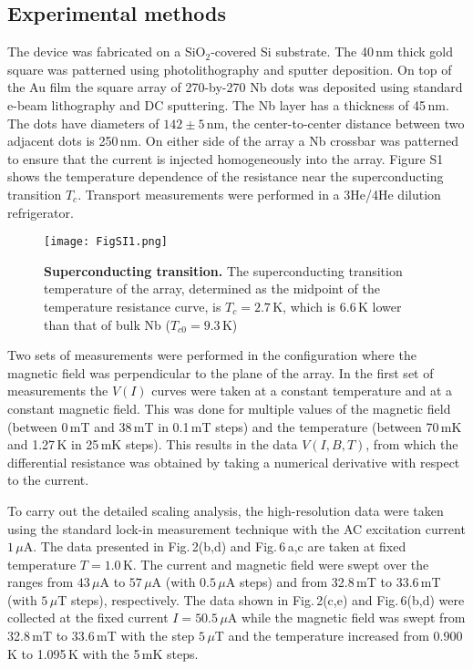 \documentclass[aps,twocolumn,prl,10pt,amsmath,amssymb,nofootinbib,showpacs,superscriptaddress,floatfix]{revtex4-1}
\begin{document}
\subsection{Experimental methods}
The device was fabricated on a SiO$_2$-covered Si substrate. The 40\,nm thick gold square was patterned using photolithography and sputter deposition. On top of the Au film the square array of 270-by-270 Nb dots was deposited using standard e-beam lithography and DC sputtering. The Nb layer has a thickness of 45\,nm. The dots have diameters of $142\pm 5$\,nm, the center-to-center distance between two adjacent dots is 250\,nm. On  either side of the array a Nb crossbar was patterned to ensure that the current is injected homogeneously into the array. Figure S1 shows the temperature dependence of the resistance near the superconducting transition $T_c$. Transport measurements were performed in a 3He/4He dilution refrigerator. 

\begin{figure}[h!]
	\begin{center}
		\texttt{[image: FigSI1.png]} %
		\caption{{\bf Superconducting transition.} 
			The superconducting transition temperature of the array, determined as the midpoint of the temperature resistance curve, is $T_c = 2.7$\,K, which is 6.6\,K lower than that of bulk Nb ($T_{c0} = 9.3$\,K)
		}
		\label{Sup1}
	\end{center}
\end{figure}

Two sets of measurements were performed in the configuration where the magnetic field was perpendicular to the plane of the array. 
In the first set of measurements the $V(I)$ curves were taken at a constant temperature and at a constant magnetic field. 
This was done for multiple values of the magnetic field (between 0\,mT and 38\,mT in 0.1\,mT steps) and the temperature (between 70\,mK and 1.27\,K in 25\,mK steps). This results in the data $V(I,B,T)$, from which the differential resistance was obtained by taking a numerical derivative with respect to the current. 

To carry out the detailed scaling analysis, the high-resolution data were taken using the standard lock-in measurement technique with the AC excitation current $1\,\mu$A. 
The data presented in Fig.\,2(b,d) and Fig.\,6\,a,c are taken at fixed temperature $T=1.0$\,K. The current and magnetic field were swept over the ranges from $43\,\mu$A to $57\,\mu$A (with $0.5\,\mu$A steps) and from 32.8\,mT to 33.6\,mT (with $5\,\mu$T steps), respectively. 
The data shown in Fig.\,2(c,e) and Fig.\,6(b,d) were collected at  the fixed current $I = 50.5$\,$\mu$A while the magnetic field was swept from 32.8\,mT to 33.6\,mT with the step $5\,\mu$T and the temperature increased from 0.900\,K to 1.095\,K with the 5\,mK steps.
\end{document}
